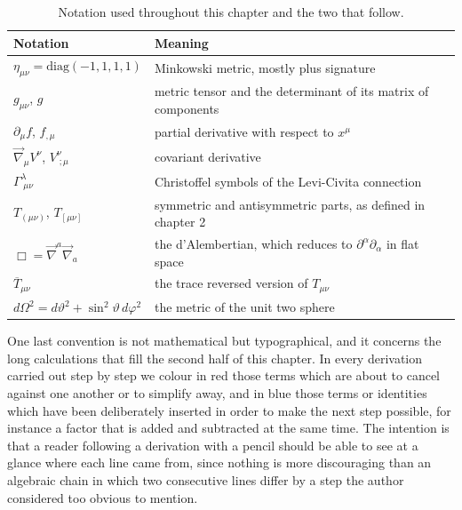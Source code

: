     \begin{table}[ht]
        \centering
        \small
        \begin{tabular}{p{} p{}}
            \hline
            \textbf{Notation} & \textbf{Meaning}\\
            \hline
            $\eta_{\mu\nu}=\mathrm{diag}(-1,1,1,1)$ & Minkowski metric, mostly plus signature\\
            $g_{\mu\nu}$, $g$ & metric tensor and the determinant of its matrix of components\\
            $\partial_{\mu}f$, $f_{,\mu}$ & partial derivative with respect to $x^{\mu}$\\
            $\Vec{\nabla}_{\mu}V^{\nu}$, $V^{\nu}_{\;;\mu}$ & covariant derivative\\
            $\Gamma^{\lambda}_{\;\mu\nu}$ & Christoffel symbols of the Levi-Civita connection\\
            $T_{(\mu\nu)}$, $T_{[\mu\nu]}$ & symmetric and antisymmetric parts, as defined in chapter 2\\
            $\Box = \Vec{\nabla}^a\Vec{\nabla}_a$ & the d'Alembertian, which reduces to $\partial^{\alpha}\partial_{\alpha}$ in flat space\\
            $\overline{T}_{\mu\nu}$ & the trace reversed version of $T_{\mu\nu}$\\
            $d\Omega^2 = d\vartheta^2 + \sin^2\vartheta\,d\varphi^2$ & the metric of the unit two sphere\\
            \hline
        \end{tabular}
        \caption{Notation used throughout this chapter and the two that follow.}
        \label{tab:Conventions}
    \end{table}

    One last convention is not mathematical but typographical, and it concerns the long calculations that fill the second half of this chapter. In every derivation carried out step by step we colour in {\color{red}red} those terms which are about to cancel against one another or to simplify away, and in {\color{blue}blue} those terms or identities which have been deliberately inserted in order to make the next step possible, for instance a factor that is added and subtracted at the same time. The intention is that a reader following a derivation with a pencil should be able to see at a glance where each line came from, since nothing is more discouraging than an algebraic chain in which two consecutive lines differ by a step the author considered too obvious to mention.

